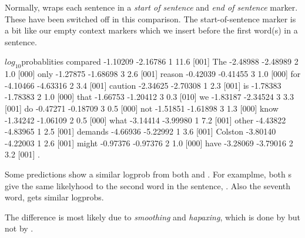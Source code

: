 \documentclass[a4paper,10pt,twoside]{report}
\begin{document}
Normally, \srilm{} wraps each sentence in a \emph{start of sentence}
and \emph{end of sentence} marker. These have been switched off in
this comparison. The start-of-sentence marker is a bit like
our empty context markers which we insert before the first word(s) in
a sentence. 

\begin{wout}{$log_{10}$probablities compared}
-1.10209 -2.16786 1   11.6 [001] The
-2.48988 -2.48989 2    1.0 [000] only
-1.27875 -1.68698 3    2.6 [001] reason
-0.42039 -0.41455 3    1.0 [000] for
-4.10466 -4.63316 2    3.4 [001] caution
-2.34625 -2.70308 1    2.3 [001] is
-1.78383 -1.78383 2    1.0 [000] that
-1.66753 -1.20412 3    0.3 [010] we
-1.83187 -2.34524 3    3.3 [001] do
-0.47271 -0.18709 3    0.5 [000] not
-1.51851 -1.61898 3    1.3 [000] know
-1.34242 -1.06109 2    0.5 [000] what
-3.14414 -3.99980 1    7.2 [001] other
-4.43822 -4.83965 1    2.5 [001] demands
-4.66936 -5.22992 1    3.6 [001] Colston
-3.80140 -4.22003 1    2.6 [001] might
-0.97376 -0.97376 2    1.0 [000] have
-3.28069 -3.79016 2    3.2 [001] .
\end{wout}

Some predictions show a similar logprob from both \wopr{} and
\srilm{}. For examplme, both \lm{}s give the same likelyhood to the
second word in the sentence, . Also the seventh word,
 gets similar logprobs. 

The difference is most likely due to \emph{smoothing} and
\emph{hapaxing}, which is done by \srilm{} but not by \wopr{}.

\end{document}
